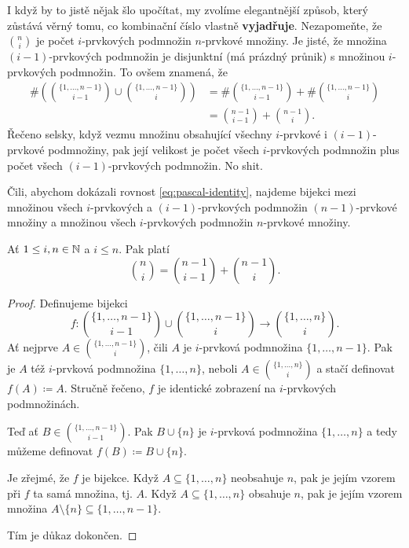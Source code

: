 I když by to jistě nějak šlo upočítat, my zvolíme elegantnější způsob, který
zůstává věrný tomu, co kombinační číslo vlastně \textbf{vyjadřuje}. Nezapomeňte,
že $\binom{n}{i}$ je počet $i$-prvkových podmnožin $n$-prvkové množiny. Je
jisté, že množina $(i-1)$-prvkových podmnožin je disjunktní (má prázdný průnik) s
množinou $i$-prvkových podmnožin. To ovšem znamená, že
\begin{align*}
 \# \left( \binom{\{1,\ldots,n-1\}}{i-1} \cup \binom{\{1,\ldots,n-1\}}{i}
 \right)
 &= \# \binom{\{1,\ldots,n-1\}}{i-1} + \# \binom{\{1,\ldots,n-1\}}{i}\\
 &= \binom{n-1}{i-1} + \binom{n-1}{i}.
\end{align*}
Řečeno selsky, když vezmu množinu obsahující všechny $i$-prvkové i
$(i-1)$-prvkové podmnožiny, pak její velikost je počet všech $i$-prvkových
podmnožin plus počet všech $(i-1)$-prvkových podmnožin. No shit.

Čili, abychom dokázali rovnost \eqref{eq:pascal-identity}, najdeme bijekci mezi
množinou všech $i$-prvkových a $(i-1)$-prvkových podmnožin $(n-1)$-prvkové
množiny a množinou všech  $i$-prvkových podmnožin $n$-prvkové množiny.

\begin{claim}
 \label{claim:pascalova-rovnost}
 Ať $1 \leq i,n \in \mathbb{N}$ a $i \leq n$. Pak platí
 \[
  \binom{n}{i} = \binom{n-1}{i-1} + \binom{n-1}{i}.
 \]
\end{claim}
\begin{proof}
 Definujeme bijekci
 \[ 
  f: \binom{\{1,\ldots,n-1\}}{i-1} \cup \binom{\{1,\ldots,n-1\}}{i} \to
  \binom{\{1,\ldots,n\}}{i}.
 \]
 Ať nejprve $A \in \binom{\{1,\ldots,n-1\}}{i}$, čili $A$ je $i$-prvková
 podmnožina ${\{1,\ldots,n-1\}}$. Pak je $A$ též $i$-prvková podmnožina
 $\{1,\ldots,n\}$, neboli $A \in \binom{\{1,\ldots,n\}}{i}$ a stačí definovat
 $f(A) \coloneqq A$. Stručně řečeno, $f$ je identické zobrazení na $i$-prvkových
 podmnožinách.

 Teď ať $B \in \binom{\{1,\ldots,n-1\}}{i-1}$. Pak $B \cup \{n\}$ je $i$-prvková
 podmnožina $\{1,\ldots,n\}$ a tedy můžeme definovat $f(B) \coloneqq B \cup
 \{n\}$.

 Je zřejmé, že $f$ je bijekce. Když $A \subseteq \{1,\ldots,n\}$ neobsahuje $n$,
 pak je jejím vzorem při $f$ ta samá množina, tj. $A$. Když $A \subseteq
 \{1,\ldots,n\}$ obsahuje $n$, pak je jejím vzorem množina $A \setminus
 \{n\} \subseteq \{1,\ldots,n-1\}$.

 Tím je důkaz dokončen.
\end{proof}

